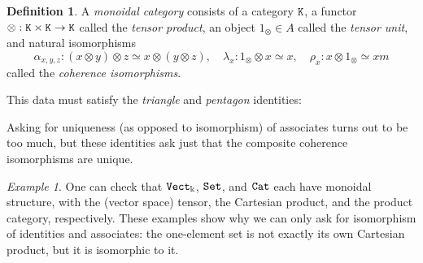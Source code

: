 \documentclass[11 pt]{amsart}
\theoremstyle{plain}   %
\theoremstyle{definition}
\newtheorem{defn}{Definition}[section]
\theoremstyle{remark}
\newtheorem{ex}{Example}[section]
\numberwithin{equation}{section}
\newcommand{\punctuation}[1]{\makebox[0pt][l]{#1}}
\newcommand{\cat}[1]{{\normalfont\texttt{#1}}}
\begin{document}
\begin{defn}
	A \emph{monoidal category} consists of a category $\cat{K}$, a functor
	$\otimes: \cat{K}\times\cat{K}\rightarrow\cat{K}$ called the \emph{tensor
		product}, an object $1_\otimes\in A$ called the \emph{tensor unit}, and natural
	isomorphisms
	$$\alpha_{x,y,z}: (x\otimes y)\otimes z\simeq x\otimes(y\otimes z),\quad
		\lambda_x: 1_\otimes\otimes x\simeq x,\quad \rho_x: x\otimes1_\otimes\simeq xm$$
	called the \emph{coherence isomorphisms}.

	This data must satisfy the \emph{triangle} and \emph{pentagon} identities:

	\begin{figure}[H]
		\centering
	\end{figure}

	Asking for uniqueness (as opposed to isomorphism) of associates turns out to be
	too much, but these identities ask just that the composite coherence
	isomorphisms are unique.
\end{defn}

\begin{ex}
	One can check that $\cat{Vect}_\Bbbk$, $\cat{Set}$, and $\cat{Cat}$ each have
	monoidal structure, with the (vector space) tensor, the Cartesian product, and
	the product category, respectively. These examples show why we can only ask
	for isomorphism of identities and associates: the one-element set is not
	exactly its own Cartesian product, but it is isomorphic to it.
\end{ex}
\end{document}
